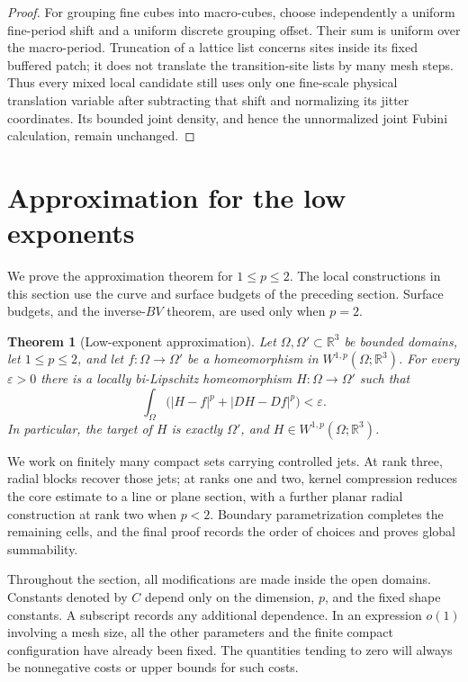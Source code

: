 \documentclass[11pt]{article}
\numberwithin{equation}{section}
\newtheorem{theorem}{Theorem}[section]
\theoremstyle{definition}
\theoremstyle{remark}
\newcommand{\R}{\mathbb R}
\newcommand{\eps}{\varepsilon}
\begin{document}
\begin{proof}
For grouping fine cubes into macro-cubes, choose independently
a uniform fine-period shift and a uniform discrete grouping
offset.  Their sum is uniform over the macro-period.  Truncation
of a lattice list concerns sites inside its fixed buffered patch;
it does not translate the transition-site lists by many mesh
steps.  Thus every mixed local candidate still uses only one
fine-scale physical translation variable after subtracting that
shift and normalizing its jitter coordinates.  Its bounded joint
density, and hence the unnormalized joint Fubini calculation,
remain unchanged.
\end{proof}

\section{Approximation for the low exponents}\label{sec:low-assembly}

We prove the approximation theorem for $1\le p\le2$.  The local
constructions in this section use the curve and surface budgets of the
preceding section.  Surface budgets, and the inverse-$BV$ theorem, are
used only when $p=2$.

\begin{theorem}[Low-exponent approximation]\label{la:approximation}
Let $\Omega,\Omega'\subset\R^3$ be bounded domains, let $1\le p\le2$, and
let $f:\Omega\to\Omega'$ be a homeomorphism in
$W^{1,p}(\Omega;\R^3)$.  For every $\eps>0$ there is a locally
bi-Lipschitz homeomorphism $H:\Omega\to\Omega'$ such that
\begin{equation}\label{la:goal}
 \int_\Omega \bigl(|H-f|^p+|DH-Df|^p\bigr)<\eps.
\end{equation}
In particular, the target of $H$ is exactly $\Omega'$, and
$H\in W^{1,p}(\Omega;\R^3)$.
\end{theorem}

We work on finitely many compact sets carrying controlled jets.
At rank three, radial blocks recover those jets; at ranks one and two,
kernel compression reduces the core estimate to a line or plane section,
with a further planar radial construction at rank two when $p<2$.
Boundary parametrization completes the remaining cells, and the final
proof records the order of choices and proves global summability.

Throughout the section, all modifications are made inside the open
domains.  Constants denoted by $C$ depend only on the dimension, $p$,
and the fixed shape constants.  A subscript records any additional
dependence.  In an expression $o(1)$ involving a mesh size, all the
other parameters and the finite compact configuration have already
been fixed.  The quantities tending to zero will always be
nonnegative costs or upper bounds for such costs.
\end{document}

